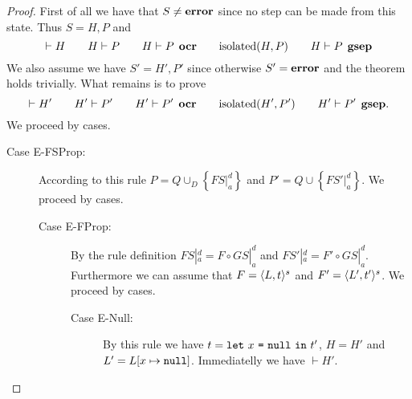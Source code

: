 \begin{proof} 
  First of all we have that $S \neq \mbox{{\bf error}}$ since no step can be made from this
  state. Thus $S = H, P$ and
  \begin{equation*}
    \vdash H \quad\quad H \vdash P \quad\quad H \vdash P \:\: \mbox{\bf ocr} \quad\quad
    \mbox{$\mathrm{isolated}$}{(H, P)} \quad\quad H \vdash P \:\: \mbox{\bf gsep}
  \end{equation*}
  We also assume we have $S' = H', P'$ since otherwise $S' = \mbox{{\bf error}}$ and the
  theorem holds trivially. What remains is to prove
  \begin{equation*}
    \vdash H' \quad\quad H' \vdash P' \quad\quad H' \vdash P' \:\: \mbox{\bf ocr} \quad\quad
    \mbox{$\mathrm{isolated}$}{(H', P')} \quad\quad H' \vdash P' \:\: \mbox{\bf gsep}.
  \end{equation*}
  We proceed by cases.
  \begin{description}
    \item[Case {\sc E-FSProp}:] According to this rule $P = Q \cup_D \left\{
        FS|_a^d \right\}$ and $P' = Q \cup \left\{ FS'|_a^d \right\}$. We proceed by cases.
      \begin{description}
        \item[Case {\sc E-FProp}:] By the rule definition $FS|_a^d = F \circ
          GS|_a^d$ and $FS'|_a^d = F' \circ GS|_a^d$. Furthermore we can assume
          that $F = \mbox{$\langle L, t \rangle^s$}$ and $F' = \mbox{$\langle L', t' \rangle^s$}$.
          We proceed by cases.
          \begin{description}
            \item[Case {\sc E-Null}:] By this rule we have $t =
              \mbox{\texttt{let}~$x$~\texttt{=}~$\mbox{\texttt{null}}$~\texttt{in}~$t'$}$, $H = H'$ and $L' = L[x \mapsto \mbox{\texttt{null}}]$.
              Immediatelly we have $\vdash H'$.


\end{description}
\end{description}
\end{description}
\end{proof}
